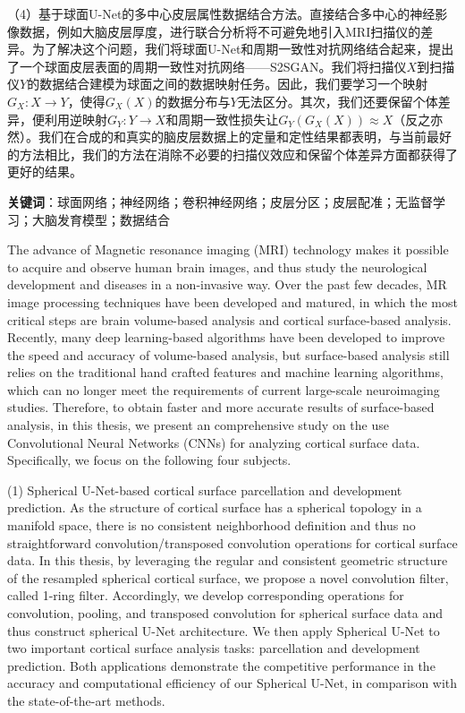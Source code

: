 （4）基于球面U-Net的多中心皮层属性数据结合方法。直接结合多中心的神经影像数据，例如大脑皮层厚度，进行联合分析将不可避免地引入MRI扫描仪的差异。为了解决这个问题，我们将球面U-Net和周期一致性对抗网络结合起来，提出了一个球面皮层表面的周期一致性对抗网络——S2SGAN。我们将扫描仪$X$到扫描仪$Y$的数据结合建模为球面之间的数据映射任务。因此，我们要学习一个映射$G_X:X\rightarrow Y$，使得$G_X(X)$的数据分布与$Y$无法区分。其次，我们还要保留个体差异，便利用逆映射$G_Y:Y\rightarrow X$和周期一致性损失让$G_Y(G_X(X))\approx X$（反之亦然）。我们在合成的和真实的脑皮层数据上的定量和定性结果都表明，与当前最好的方法相比，我们的方法在消除不必要的扫描仪效应和保留个体差异方面都获得了更好的结果。



\textbf{关键词}：球面网络；神经网络；卷积神经网络；皮层分区；皮层配准；无监督学习；大脑发育模型；数据结合






\cleardoublepage
{}
The advance of Magnetic resonance imaging (MRI) technology makes it possible to acquire and observe human brain images, and thus study the neurological development and diseases in a non-invasive way. Over the past few decades, MR image processing techniques have been developed and matured, in which the most critical steps are brain volume-based analysis and cortical surface-based analysis. Recently, many deep learning-based algorithms have been developed to improve the speed and accuracy of volume-based analysis, but surface-based analysis still relies on the traditional hand crafted features and machine learning algorithms, which can no longer meet the requirements of current large-scale neuroimaging studies. Therefore, to obtain faster and more accurate results of surface-based analysis, in this thesis, we present an comprehensive study on the use Convolutional Neural Networks (CNNs) for analyzing cortical surface data. Specifically, we focus on the following four subjects.

(1) Spherical U-Net-based cortical surface parcellation and development prediction. As the structure of cortical surface has a spherical topology in a manifold space, there is no consistent neighborhood definition and thus no straightforward convolution/transposed convolution operations for cortical surface data. In this thesis, by leveraging the regular and consistent geometric structure of the resampled spherical cortical surface, we propose a novel convolution filter, called 1-ring filter. Accordingly, we develop corresponding operations for convolution, pooling, and transposed convolution for spherical surface data and thus construct spherical U-Net architecture. We then apply Spherical U-Net to two important cortical surface analysis tasks: parcellation and development prediction. Both applications demonstrate the competitive performance in the accuracy and computational efficiency of our Spherical U-Net, in comparison with the state-of-the-art methods.
 
